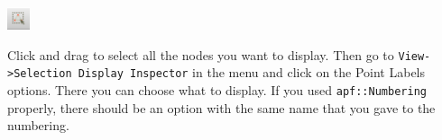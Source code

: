 \documentclass{article}
\begin{document}
\begin{center}
\includegraphics[width=0.05\textwidth]{select_nodes.png}
\end{center}

Click and drag to select all the nodes you want to display.
Then go to \texttt{View->Selection Display Inspector} in the menu and click on
the Point Labels options.
There you can choose what to display.
If you used \texttt{apf::Numbering} properly, there should be an option
with the same name that you gave to the numbering.
\end{document}
